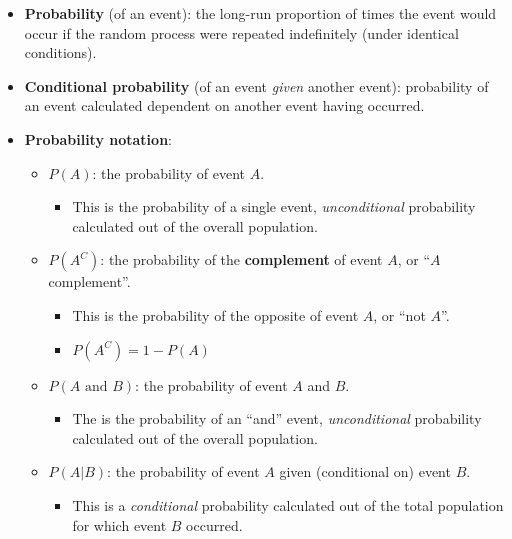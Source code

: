 \documentclass[
]{report}
\providecommand{\tightlist}{%
  \setlength{\itemsep}{0pt}\setlength{\parskip}{0pt}}
\begin{document}
\begin{itemize}
\item
  \textbf{Probability} (of an event): the long-run proportion of times the event would occur if the random process were repeated indefinitely (under identical conditions).
\item
  \textbf{Conditional probability} (of an event \emph{given} another event): probability of an event calculated dependent on another event having occurred.
\item
  \textbf{Probability notation}:

  \begin{itemize}
  \item
    \(P(A)\): the probability of event \(A\).

    \begin{itemize}
    \tightlist
    \item
      This is the probability of a single event, \emph{unconditional} probability calculated out of the overall population.
    \end{itemize}
  \item
    \(P(A^C)\): the probability of the \textbf{complement} of event \(A\), or ``\(A\) complement''.

    \begin{itemize}
    \item
      This is the probability of the opposite of event \(A\), or ``not \(A\)''.
    \item
      \(P(A^C) = 1 - P(A)\)
    \end{itemize}
  \item
    \(P(A\text{ and }B)\): the probability of event \(A\) and \(B\).

    \begin{itemize}
    \tightlist
    \item
      The is the probability of an ``and'' event, \emph{unconditional} probability calculated out of the overall population.
    \end{itemize}
  \item
    \(P(A|B)\): the probability of event \(A\) given (conditional on) event \(B\).

    \begin{itemize}
    \tightlist
    \item
      This is a \emph{conditional} probability calculated out of the total population for which event \(B\) occurred.
    \end{itemize}
  \end{itemize}
\end{itemize}
\end{document}
